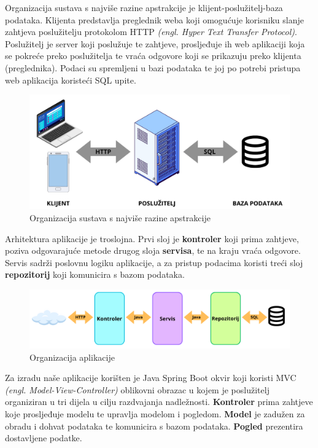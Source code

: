 	Organizacija sustava s najviše razine apstrakcije je klijent-poslužitelj-baza podataka. Klijenta predstavlja preglednik weba koji omogućuje korisniku slanje zahtjeva poslužitelju protokolom HTTP \textit{(engl. Hyper Text Transfer Protocol)}. Poslužitelj je server koji poslužuje te zahtjeve, prosljeđuje ih web aplikaciji koja se pokreće preko poslužitelja te vraća odgovore koji se prikazuju preko klijenta (preglednika). Podaci su spremljeni u bazi podataka te joj po potrebi pristupa web aplikacija koristeći SQL upite.
					\begin{figure}[H]
						\includegraphics[scale=0.4]{slike/arh1.PNG} %
						\centering
						\caption{Organizacija sustava s najviše razine apstrakcije}
						\label{fig:promjene4}
					\end{figure}	
	Arhitektura aplikacije je troslojna. Prvi sloj je \textbf {kontroler} koji prima zahtjeve, poziva odgovarajuće metode drugog sloja \textbf {servisa}, te na kraju vraća odgovore. Servis sadrži poslovnu logiku aplikacije, a za pristup podacima koristi treći sloj \textbf {repozitorij} koji komunicira s bazom podataka.
					\begin{figure}[H]
						\includegraphics[scale=0.3]{slike/arh2.PNG} %
						\centering
						\caption{Organizacija aplikacije}
						\label{fig:promjene5}
					\end{figure}	
	Za izradu naše aplikacije korišten je Java Spring Boot okvir koji koristi MVC \textit{(engl. Model-View-Controller)} oblikovni obrazac u kojem je poslužitelj organiziran u tri dijela u cilju razdvajanja nadležnosti. \textbf {Kontroler} prima zahtjeve koje prosljeđuje modelu te upravlja modelom i pogledom. \textbf {Model} je zadužen za obradu i dohvat podataka te komunicira s bazom podataka. \textbf {Pogled} prezentira dostavljene podatke.
	
